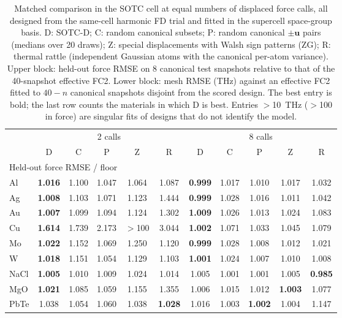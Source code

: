 \begin{table}[t]
\caption{Matched comparison in the SOTC cell at equal numbers of displaced force calls, all designed from the same-cell harmonic FD trial and fitted in the supercell space-group basis. D: SOTC-D; C: random canonical subsets; P: random canonical $\pm\mathbf u$ pairs (medians over 20 draws); Z: special displacements with Walsh sign patterns (ZG); R: thermal rattle (independent Gaussian atoms with the canonical per-atom variance). Upper block: held-out force RMSE on 8 canonical test snapshots relative to that of the 40-snapshot effective FC2. Lower block: mesh RMSE (THz) against an effective FC2 fitted to $40-n$ canonical snapshots disjoint from the scored design. The best entry is bold; the last row counts the materials in which D is best. Entries $>$10~THz ($>$100 in force) are singular fits of designs that do not identify the model.}
\label{tab:matched}
\begin{ruledtabular}
\begin{tabular}{lcccccccccc}
 & \multicolumn{5}{c}{2 calls} & \multicolumn{5}{c}{8 calls}\\
 & D & C & P & Z & R & D & C & P & Z & R\\
\hline
\multicolumn{11}{l}{Held-out force RMSE / floor}\\
Al & \textbf{1.016} & 1.100 & 1.047 & 1.064 & 1.087 & \textbf{0.999} & 1.017 & 1.010 & 1.017 & 1.032\\
Ag & \textbf{1.008} & 1.103 & 1.071 & 1.123 & 1.444 & \textbf{0.999} & 1.028 & 1.016 & 1.011 & 1.042\\
Au & \textbf{1.007} & 1.099 & 1.094 & 1.124 & 1.302 & \textbf{1.009} & 1.026 & 1.013 & 1.024 & 1.083\\
Cu & \textbf{1.614} & 1.739 & 2.173 & $>$100 & 3.044 & \textbf{1.002} & 1.071 & 1.033 & 1.045 & 1.079\\
Mo & \textbf{1.022} & 1.152 & 1.069 & 1.250 & 1.120 & \textbf{0.999} & 1.028 & 1.008 & 1.012 & 1.021\\
W & \textbf{1.018} & 1.151 & 1.054 & 1.129 & 1.103 & \textbf{1.001} & 1.024 & 1.007 & 1.010 & 1.008\\
NaCl & \textbf{1.005} & 1.010 & 1.009 & 1.024 & 1.014 & 1.005 & 1.001 & 1.001 & 1.005 & \textbf{0.985}\\
MgO & \textbf{1.021} & 1.085 & 1.059 & 1.155 & 1.355 & 1.006 & 1.015 & 1.012 & \textbf{1.003} & 1.077\\
PbTe & 1.038 & 1.054 & 1.060 & 1.038 & \textbf{1.028} & 1.016 & 1.003 & \textbf{1.002} & 1.004 & 1.147\\

\end{tabular}
\end{ruledtabular}
\end{table}
